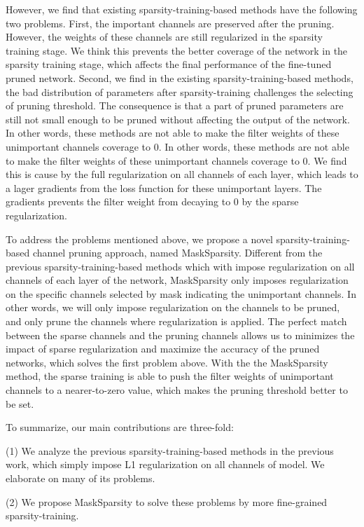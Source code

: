 \documentclass[review]{cvpr}
\begin{document}
However, we find that existing sparsity-training-based methods have the following two problems. First, the important channels are preserved after the pruning. However, the weights of these channels are still regularized in the sparsity training stage. We think this prevents the better coverage of the network in the sparsity training stage, which affects the final performance of the fine-tuned pruned network. Second, we find in the existing sparsity-training-based methods, the bad distribution of parameters after sparsity-training challenges the selecting of pruning threshold. The consequence is that a part of pruned parameters are still not small enough to be pruned without affecting the output of the network. In other words, these methods are not able to make the filter weights of these unimportant channels coverage to 0. In other words, these methods are not able to make the filter weights of these unimportant channels coverage to 0. We find this is cause by the full regularization on all channels of each layer, which leads to a lager gradients from the loss function for these unimportant layers. The gradients prevents the filter weight from decaying to 0 by the sparse regularization.


To address the problems mentioned above, we propose a novel sparsity-training-based channel pruning approach, named MaskSparsity. Different from the previous sparsity-training-based methods which with impose regularization on all channels of each layer of the network, MaskSparsity only imposes regularization on the specific channels selected by mask indicating the unimportant channels. In other words, we will only impose regularization on the channels to be pruned, and only prune the channels where regularization is applied. The perfect match between the sparse channels and the pruning channels allows us to minimizes the impact of sparse regularization and maximize the accuracy of the pruned networks, which solves the first problem above. With the the MaskSparsity method, the sparse training is able to push the filter weights of unimportant channels to a nearer-to-zero value, which makes the pruning threshold better to be set.

To summarize, our main contributions are three-fold:

(1)	We analyze the previous sparsity-training-based methods in the previous work, which simply impose L1 regularization on all channels of model. We elaborate on many of its problems.

(2)	We propose MaskSparsity to solve these problems by more fine-grained sparsity-training.
\end{document}
